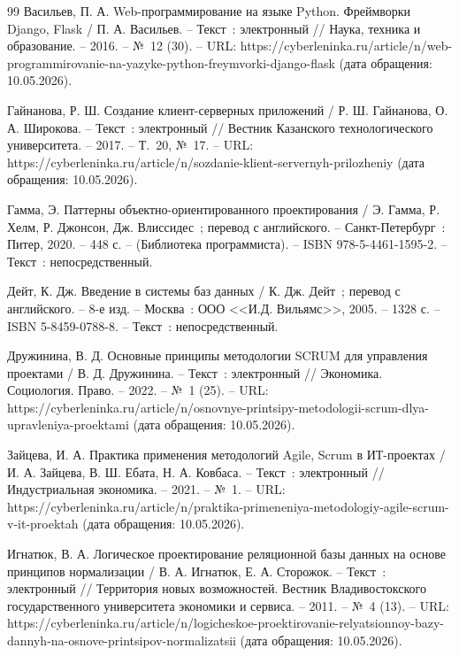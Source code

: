 \begin{thebibliography}{99}
	 Васильев, П. А. Web-программирование на языке Python. Фреймворки Django, Flask / П. А. Васильев. -- Текст~: электронный // Наука, техника и образование. -- 2016. -- №~12 (30). -- URL: https://cyberleninka.ru/article/n/web-programmirovanie-na-yazyke-python-freymvorki-django-flask (дата обращения: 10.05.2026).

	 Гайнанова, Р. Ш. Создание клиент-серверных приложений / Р. Ш. Гайнанова, О. А. Широкова. -- Текст~: электронный // Вестник Казанского технологического университета. -- 2017. -- Т.~20, №~17. -- URL: https://cyberleninka.ru/article/n/sozdanie-klient-servernyh-prilozheniy (дата обращения: 10.05.2026).

	 Гамма, Э. Паттерны объектно-ориентированного проектирования / Э. Гамма, Р. Хелм, Р. Джонсон, Дж. Влиссидес~; перевод с английского. -- Санкт-Петербург~: Питер, 2020. -- 448 с. -- (Библиотека программиста). -- ISBN 978-5-4461-1595-2. -- Текст~: непосредственный.

	 Дейт, К. Дж. Введение в системы баз данных / К. Дж. Дейт~; перевод с английского. -- 8-е изд. -- Москва~: ООО <<И.Д. Вильямс>>, 2005. -- 1328 с. -- ISBN 5-8459-0788-8. -- Текст~: непосредственный.

	 Дружинина, В. Д. Основные принципы методологии SCRUM для управления проектами / В. Д. Дружинина. -- Текст~: электронный // Экономика. Социология. Право. -- 2022. -- №~1 (25). -- URL: https://cyberleninka.ru/article/n/osnovnye-printsipy-metodologii-scrum-dlya-upravleniya-proektami (дата обращения: 10.05.2026).

	 Зайцева, И. А. Практика применения методологий Agile, Scrum в ИТ-проектах / И. А. Зайцева, В. Ш. Ебата, Н. А. Ковбаса. -- Текст~: электронный // Индустриальная экономика. -- 2021. -- №~1. -- URL: https://cyberleninka.ru/article/n/praktika-primeneniya-metodologiy-agile-scrum-v-it-proektah (дата обращения: 10.05.2026).

	 Игнатюк, В. А. Логическое проектирование реляционной базы данных на основе принципов нормализации / В. А. Игнатюк, Е. А. Сторожок. -- Текст~: электронный // Территория новых возможностей. Вестник Владивостокского государственного университета экономики и сервиса. -- 2011. -- №~4 (13). -- URL: https://cyberleninka.ru/article/n/logicheskoe-proektirovanie-relyatsionnoy-bazy-dannyh-na-osnove-printsipov-normalizatsii (дата обращения: 10.05.2026).


\end{thebibliography}
